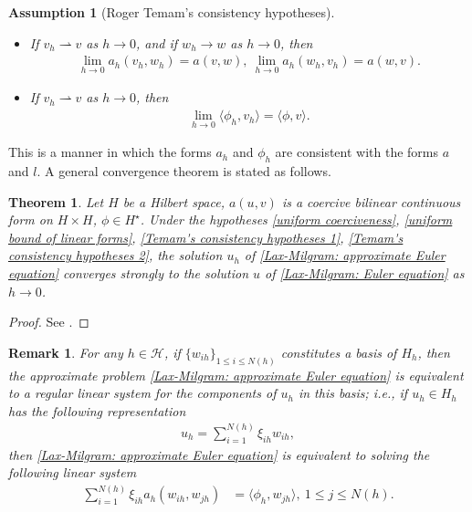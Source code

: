 \documentclass[oneside,11pt]{book}
\numberwithin{equation}{section}
\newtheorem{assumption}{Assumption}[section]
\newtheorem{theorem}{Theorem}[section]
\newtheorem{remark}{Remark}[section]
\begin{document}
\begin{assumption}[Roger Temam's consistency hypotheses]
    \begin{itemize}
        \item[(i)] If $v_h\rightharpoonup v$ as $h\to 0$, and if $w_h\to w$ as $h\to 0$, then
        \begin{align}
            \label{Temam's consistency hypotheses 1}
            \lim_{h\to 0} a_h(v_h,w_h) = a(v,w),\ \lim_{h\to 0} a_h(w_h,v_h) = a(w,v).
        \end{align}
        \item[(ii)] If $v_h\rightharpoonup v$ as $h\to 0$, then
        \begin{align}
            \label{Temam's consistency hypotheses 2}
            \lim_{h\to 0} \langle\phi_h,v_h\rangle = \langle\phi,v\rangle.
        \end{align}
    \end{itemize}
\end{assumption}
This is a manner in which the forms $a_h$ and $\phi_h$ are consistent with the forms $a$ and $l$. A general convergence theorem is stated as follows.

\begin{theorem}
    Let $H$ be a Hilbert space, $a(u,v)$ is a coercive bilinear continuous form on $H\times H$, $\phi\in H^\star$. Under the hypotheses \eqref{uniform coerciveness}, \eqref{uniform bound of linear forms}, \eqref{Temam's consistency hypotheses 1}, \eqref{Temam's consistency hypotheses 2}, the solution $u_h$ of \eqref{Lax-Milgram: approximate Euler equation} converges strongly to the solution $u$ of \eqref{Lax-Milgram: Euler equation} as $h\to 0$.
\end{theorem}

\begin{proof}
    See \cite[pp. 32--33]{Temam2000}.
\end{proof}

\begin{remark}
    For any $h\in\mathcal{H}$, if $\{w_{ih}\}_{1\le i\le N(h)}$ constitutes a basis of $H_h$, then the approximate problem \eqref{Lax-Milgram: approximate Euler equation} is equivalent to a regular linear system for the components of $u_h$ in this basis; i.e., if $u_h\in H_h$ has the following representation
    \begin{align*}
        u_h = \sum_{i=1}^{N(h)} \xi_{ih}w_{ih},
    \end{align*}
    then \eqref{Lax-Milgram: approximate Euler equation} is equivalent to solving the following linear system
    \begin{align*}
        \sum_{i=1}^{N(h)} \xi_{ih}a_h(w_{ih},w_{jh}) &= \langle\phi_h,w_{jh}\rangle,\ 1\le j\le N(h).
    \end{align*}
\end{remark}
\end{document}
